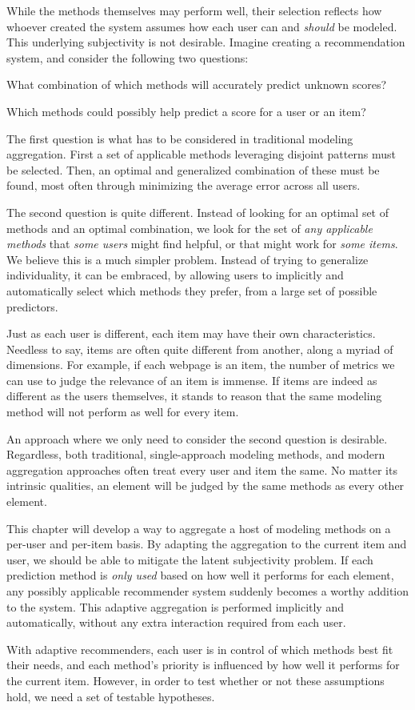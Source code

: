 While the methods themselves may perform well, their selection
reflects how whoever created the system assumes how each user
can and \emph{should} be modeled. This underlying subjectivity is not desirable.
Imagine creating a recommendation system, and consider the following two questions:

\begin{enumerate*}
  \item What combination of which methods will accurately predict unknown scores?
  \item Which methods could possibly help predict a score for a user or an item?
\end{enumerate*}

The first question is what has to be considered in traditional modeling aggregation.
First a set of applicable methods leveraging disjoint patterns must be selected. 
Then, an optimal and generalized combination of these must be found,
most often through minimizing the average error across all users.

The second question is quite different. 
Instead of looking for an optimal set of methods and an optimal combination,
we look for the set of \emph{any applicable methods} that \emph{some users} might find helpful,
or that might work for \emph{some items}.
We believe this is a much simpler problem. 
Instead of trying to generalize individuality,
it can be embraced, by allowing users to implicitly and automatically select which methods they prefer,
from a large set of possible predictors.

Just as each user is different, each item may have their own characteristics.
Needless to say, items are often quite different from another,
along a myriad of dimensions. For example,
if each webpage is an item, the number of metrics we can use to judge
the relevance of an item is immense.
If items are indeed as different as the users themselves, it stands to reason that the same 
modeling method will not perform as well for every item.

An approach where we only need to consider the second question is desirable.
Regardless, both traditional, single-approach modeling methods, and modern aggregation approaches
often treat every user and item the same. No matter its intrinsic qualities, an element will be judged
by the same methods as every other element. 

This chapter will develop a way to aggregate a host of modeling methods on a per-user and per-item basis.
By adapting the aggregation to the current item and user, we should be able to mitigate the latent subjectivity problem. 
If each prediction method is \emph{only used} based on how well it performs for each element,
any possibly applicable recommender system suddenly becomes a worthy addition to the system.
This adaptive aggregation is performed implicitly and automatically,
without any extra interaction required from each user.

With adaptive recommenders, each user is in control of which methods best fit their needs, and
each method's priority is influenced by how well it performs for the current item.
However, in order to test whether or not these assumptions hold,
we need a set of testable hypotheses.

\clearpage
